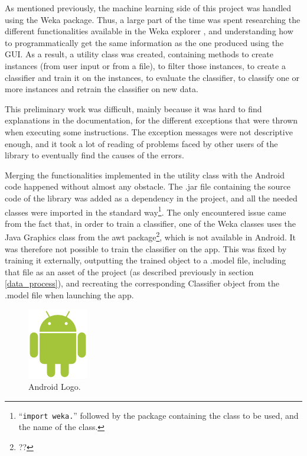 \documentclass{mproj}
\begin{document}
As mentioned previously, the machine learning side of this project was handled using the Weka package. Thus, a large part of the time was spent researching the different functionalities available in the Weka explorer \cite{wekaexplorer}, and understanding how to programmatically get the same information as the one produced using the GUI. As a result, a utility class was created, containing methods to create instances (from user input or from a file), to filter those instances, to create a classifier and train it on the instances, to evaluate the classifier, to classify one or more instances and retrain the classifier on new data. \par

This preliminary work was difficult, mainly because it was hard to find explanations in the documentation, for the different exceptions that were thrown when executing some instructions. The exception messages were not descriptive enough, and it took a lot of reading of problems faced by other users of the library to eventually find the causes of the errors. \par

Merging the functionalities implemented in the utility class with the Android code happened without almost any obstacle. The .jar file containing the source code of the library was added as a dependency in the project, and all the needed classes were imported in the standard way\footnote{``\texttt{import weka.}'' followed by the package containing the class to be used, and the name of the class.}. The only encountered issue came from the fact that, in order to train a classifier, one of the Weka classes uses the Java Graphics class from the awt package\footnote{??}, which is not available in Android. It was therefore not possible to train the classifier on the app. This was fixed by training it externally, outputting the trained object to a .model file, including that file as an asset of the project (as described previously in section \ref{data_process}), and recreating the corresponding Classifier object from the .model file when launching the app.


\begin{figure}
	\vspace{-25pt}
	\centering
	\includegraphics[scale=0.15]{images/android_logo}
	\caption{Android Logo.}
	\vspace{-1cm}
\end{figure}
\end{document}
